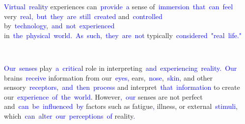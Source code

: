 \documentclass{article}
\begin{document}
\begin{tcolorbox}[colframe=black,colback=white]
{}\textcolor{blue}{Virtual}\textcolor{blue}{~reality} experiences can\textcolor{blue}{~provide}\textcolor{blue}{~a} sense of\textcolor{blue}{~immersion}\textcolor{blue}{~that}\textcolor{blue}{~can}\textcolor{blue}{~feel} very\textcolor{blue}{~real}\textcolor{blue}{,}\textcolor{blue}{~but}\textcolor{blue}{~they}\textcolor{blue}{~are}\textcolor{blue}{~still}\textcolor{blue}{~created} and\textcolor{blue}{~controlled} by\textcolor{blue}{~technology},\textcolor{blue}{~and}\textcolor{blue}{~not}\textcolor{blue}{~experienced} in\textcolor{blue}{~the}\textcolor{blue}{~physical}\textcolor{blue}{~world}\textcolor{blue}{.}\textcolor{blue}{~As}\textcolor{blue}{~such},\textcolor{blue}{~they}\textcolor{blue}{~are}\textcolor{blue}{~not} typically\textcolor{blue}{~considered}\textcolor{blue}{~"}\textcolor{blue}{real}\textcolor{blue}{~life}\textcolor{blue}{."}\textcolor{blue}{~

}\textcolor{blue}{Our}\textcolor{blue}{~senses} play\textcolor{blue}{~a}\textcolor{blue}{~critical} role in interpreting\textcolor{blue}{~and}\textcolor{blue}{~experiencing}\textcolor{blue}{~reality}\textcolor{blue}{.}\textcolor{blue}{~Our} brains\textcolor{blue}{~receive} information from our\textcolor{blue}{~eyes}\textcolor{blue}{,} ears,\textcolor{blue}{~nose},\textcolor{blue}{~skin}\textcolor{blue}{,} and other sensory\textcolor{blue}{~receptors},\textcolor{blue}{~and}\textcolor{blue}{~then}\textcolor{blue}{~process} and interpret\textcolor{blue}{~that}\textcolor{blue}{~information} to create our\textcolor{blue}{~experience}\textcolor{blue}{~of}\textcolor{blue}{~the}\textcolor{blue}{~world}. However\textcolor{blue}{,}\textcolor{blue}{~our} senses are not perfect and\textcolor{blue}{~can}\textcolor{blue}{~be}\textcolor{blue}{~influenced}\textcolor{blue}{~by} factors such as fatigue\textcolor{blue}{,} illness, or external\textcolor{blue}{~stimuli}, which\textcolor{blue}{~can}\textcolor{blue}{~alter}\textcolor{blue}{~our}\textcolor{blue}{~perceptions}\textcolor{blue}{~of} reality\textcolor{blue}{.}\textcolor{blue}{}
\end{tcolorbox}
\end{document}
